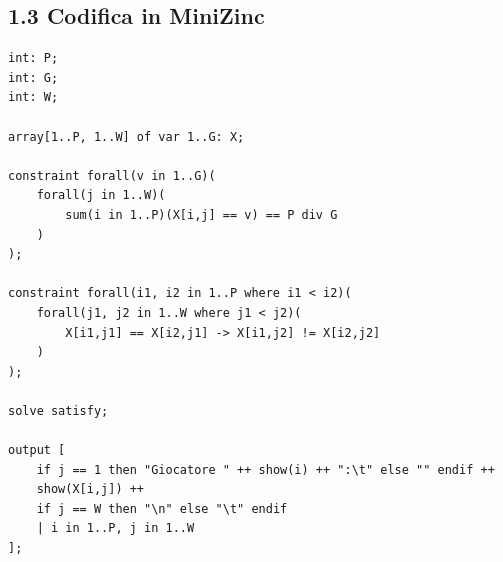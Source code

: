 \documentclass[a4paper,11pt]{article}
\begin{document}
\subsection*{1.3 Codifica in MiniZinc}
\begin{lstlisting}
int: P;
int: G;
int: W;

array[1..P, 1..W] of var 1..G: X;

constraint forall(v in 1..G)(
    forall(j in 1..W)(
        sum(i in 1..P)(X[i,j] == v) == P div G
    )
);

constraint forall(i1, i2 in 1..P where i1 < i2)(
    forall(j1, j2 in 1..W where j1 < j2)(
        X[i1,j1] == X[i2,j1] -> X[i1,j2] != X[i2,j2]
    )
);

solve satisfy;

output [
    if j == 1 then "Giocatore " ++ show(i) ++ ":\t" else "" endif ++
    show(X[i,j]) ++ 
    if j == W then "\n" else "\t" endif
    | i in 1..P, j in 1..W
];
\end{lstlisting}
\end{document}
